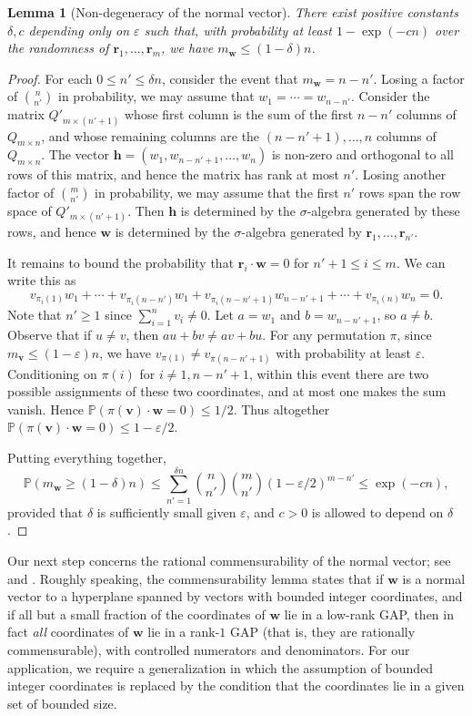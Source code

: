 \documentclass[reqno]{amsart}
\renewcommand\P{{\mathbb{P}}}
\newcommand\eps{{\varepsilon}}
\newcommand\BMh{{\bm h}}
\newcommand\BMr{{\bm r}}
\newcommand\BMv{{\bm v}}
\newcommand\BMw{{\bm w}}
\theoremstyle{plain}
\newtheorem{lemma}[theorem]{Lemma}
\theoremstyle{definition}
\begin{document}
\begin{lemma}[Non-degeneracy of the normal vector]\label{lemma:multiplicity}
There exist positive constants $\delta,c$ depending only on $\eps$ such that,
with probability at least $1-\exp(-cn)$ over the randomness of
$\BMr_{1},\dots,\BMr_{m}$, we have $m_{\BMw}\le (1-\delta)n$.
\end{lemma}

\begin{proof}
For each $0\le n'\le \delta n$, consider the event that $m_{\BMw}=n-n'$. Losing a factor of $\binom{n}{n'}$ in probability, we may assume that
$w_1=\cdots=w_{n-n'}$. 
Consider the matrix $Q'_{m\times (n'+1)}$ whose first column is the sum of the first $n-n'$ columns of $Q_{m\times n}$, and whose remaining columns are the $(n-n'+1),\dots,n$ columns of $Q_{m\times n}$. The vector $\BMh=(w_1,w_{n-n'+1},\dots,w_n)$ is non-zero and orthogonal to all rows of this
matrix, and hence the matrix has rank at most $n'$. Losing another factor of $\binom{m}{n'}$ in probability, we may assume that the
first $n'$ rows span the row space of $Q'_{m\times (n'+1)}$. Then $\BMh$ is determined by the $\sigma$-algebra generated by these rows, and hence $\BMw$ is determined by the $\sigma$-algebra generated by $\BMr_1,\ldots,\BMr_{n'}$.

It remains to bound the probability that $\BMr_i\cdot\BMw=0$ for $n'+1\le i\le m$. 
We can write this as
\[
v_{\pi_i(1)}w_{1}+\cdots+ v_{\pi_i(n-n')}w_{1}
+ v_{\pi_i(n-n'+1)}w_{n-n'+1}+\cdots+ v_{\pi_i(n)}w_{n}=0.
\] 
Note that $n'\ge 1$ since $\sum_{i=1}^n v_i\neq 0$. 
Let $a=w_1$ and $b=w_{n-n'+1}$, so $a\neq b$. Observe that if $u\neq v$, then
$au+bv\neq av+bu$.
For any permutation $\pi$, since $m_{\BMv}\le (1-\eps)n$, we have
$v_{\pi(1)}\neq v_{\pi(n-n'+1)}$ with probability at least $\eps$. 
Conditioning on $\pi(i)$ for $i\neq 1,n-n'+1$, within this event there are two possible assignments of these two coordinates, and at most one makes the sum vanish. Hence $\P(\pi(\BMv) \cdot \BMw =0) \le 1/2$. Thus altogether $\P(\pi(\BMv) \cdot \BMw =0) \le 1-\eps/2$. 

Putting everything together,
\[
\P(m_{\BMw}\ge (1-\delta)n)\le \sum_{n'=1}^{\delta n}\binom{n}{n'} \binom{m}{n'} (1-\eps/2)^{m-n'} \le \exp(-cn),
\]
 provided that $\delta$ is sufficiently small given $\eps$, and $c>0$ is allowed to depend on $\delta$.
\end{proof}

Our next step concerns the rational commensurability of the normal vector; see
\cite[Section~3.4]{Nguyen} and \cite[Theorem~5.2]{TVJAMS}.
Roughly speaking, the commensurability lemma states that if $\BMw$ is a normal vector to a hyperplane spanned by vectors with bounded integer coordinates, and if all but a small fraction of the coordinates of $\BMw$ lie in a low-rank GAP, then in fact \emph{all} coordinates of $\BMw$ lie in a rank-$1$ GAP (that is, they are rationally commensurable), with controlled numerators and denominators.
For our application, we require a generalization in which the assumption of bounded integer coordinates is replaced by the condition that the coordinates lie in a given set of bounded size.
\end{document}
